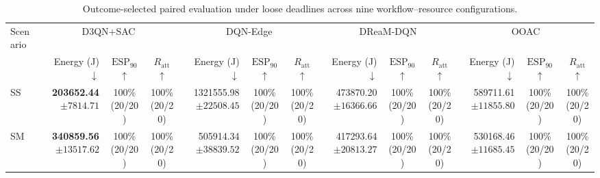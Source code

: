 
\begin{table}[!t]
\centering
\caption{Outcome-selected paired evaluation under loose deadlines across nine workflow--resource configurations.}
\label{tab:conditional_full_loose}
\begingroup
\footnotesize
\setlength{\tabcolsep}{2.2pt}
\renewcommand{\arraystretch}{1.08}
\begin{tabular}{@{}l*{4}{rcc}@{}}
\toprule
Scenario & \multicolumn{3}{c}{D3QN+SAC} & \multicolumn{3}{c}{DQN-Edge} & \multicolumn{3}{c}{DReaM-DQN} & \multicolumn{3}{c}{OOAC} \\
\cmidrule(lr){2-4}\cmidrule(lr){5-7}\cmidrule(lr){8-10}\cmidrule(lr){11-13}
 & Energy (J) $\downarrow$ & $\mathrm{ESP}_{90}$ $\uparrow$ & $R_{\mathrm{att}}$ $\uparrow$ & Energy (J) $\downarrow$ & $\mathrm{ESP}_{90}$ $\uparrow$ & $R_{\mathrm{att}}$ $\uparrow$ & Energy (J) $\downarrow$ & $\mathrm{ESP}_{90}$ $\uparrow$ & $R_{\mathrm{att}}$ $\uparrow$ & Energy (J) $\downarrow$ & $\mathrm{ESP}_{90}$ $\uparrow$ & $R_{\mathrm{att}}$ $\uparrow$ \\
\midrule
SS & \shortstack[r]{\textbf{203652.44}\\$\pm 7814.71$} & \shortstack[c]{100\%\\(20/20)} & \shortstack[c]{100\%\\(20/20)} & \shortstack[r]{1321555.98\\$\pm 22508.45$} & \shortstack[c]{100\%\\(20/20)} & \shortstack[c]{100\%\\(20/20)} & \shortstack[r]{473870.20\\$\pm 16366.66$} & \shortstack[c]{100\%\\(20/20)} & \shortstack[c]{100\%\\(20/20)} & \shortstack[r]{589711.61\\$\pm 11855.80$} & \shortstack[c]{100\%\\(20/20)} & \shortstack[c]{100\%\\(20/20)} \\
SM & \shortstack[r]{\textbf{340859.56}\\$\pm 13517.62$} & \shortstack[c]{100\%\\(20/20)} & \shortstack[c]{100\%\\(20/20)} & \shortstack[r]{505914.34\\$\pm 38839.52$} & \shortstack[c]{100\%\\(20/20)} & \shortstack[c]{100\%\\(20/20)} & \shortstack[r]{417293.64\\$\pm 20813.27$} & \shortstack[c]{100\%\\(20/20)} & \shortstack[c]{100\%\\(20/20)} & \shortstack[r]{530168.46\\$\pm 11685.45$} & \shortstack[c]{100\%\\(20/20)} & \shortstack[c]{100\%\\(20/20)} \\

\end{tabular}
\end{table}
